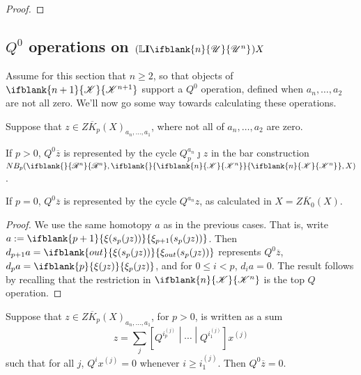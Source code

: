 \documentclass[10pt]{article}
\makeatletter
\newcommand{\PRLie}[1]{\scrR^{#1}}%
\newcommand{\LL}[1]{\ifblank{#1}{\scrK}{\scrK^{#1}}}
\newcommand{\nontop}[1]{\ifblank{#1}{\scrU}{\scrU^{#1}}}
\newcommand{\produces}[3]{{#1}{#3}{#2}}
\newcommand{\Ind}[2][]{\mathbf{I}{#2}_{#1}}%
\newcommand{\Fr}[2][]{\ifblank{#1}{#2}{#2_{#1}}}
\newcommand{\restn}[2][]{\ifblank{#1}{\xi{#2}}{\xi_{#1}{#2}}}%
\newcommand{\derived}{\mathbb{L}}
\renewcommand{\Q}{Q}
\newcommand{\minDimP}{\overline{m}}
\renewcommand{\produces}[3]{
{
\def\labelstyle{\scriptstyle}
\xymatrix@C=2em@1{
{#1}
\ar@{-}[r]|-{{\,#3\,}}
&%
{#2}%
}}}
\makeatother
\begin{document}
\begin{LieLambdaStructureOnKoszul}
\begin{proof}
%
\end{proof}

\subsection{$\Q^0$ operations on $(\derived\Ind{\nontop{n}})X$}
Assume for this section that $n\geq2$, so that objects of $\LL{n+1}$ support a $\Q^0$ operation, defined when $a_n,\ldots,a_2$ are not all zero. We'll now go some way towards calculating these operations.
\begin{lem}
Suppose that $z\in Z\overline{K}_p(X)_{a_n,\ldots,a_1}$, where not all of $a_n,\ldots,a_2$ are zero. 
\begin{itemise}
\setlength{\parindent}{.25in}
\item If $p>0$, $Q^0\overline{z}$ is represented by the cycle $\Q^{a_n}_p\jmath z$ in the bar construction $NB_p(\Fr{\PRLie{n}},\Fr{\LL{n}},X)$.
\item If $p=0$, $Q^0\overline{z}$ is represented by the cycle $\Q^{a_n}z$, as calculated in $X=Z\overline{K}_0(X)$.%
\end{itemise}
\end{lem}
\begin{proof}
We use the same homotopy $a$ as in the previous cases. That is, write
$a:=\restn[p+1]{(s_{p}(\jmath z))}$. Then $d_{p+1}a=\restn[out]{(s_{p}(\jmath z))}$ represents $Q^0\overline{z}$, $d_pa=\restn[p]{(\jmath z)}$, and for $0\leq i<p$, $d_ia=0$. The result follows by recalling that the restriction in $\LL{n}$ is the top $\Q$ operation.
\end{proof}
\begin{lem}
Suppose that $z\in Z\overline{K}_p(X)_{a_n,\ldots,a_1}$, for $p>0$, is written as a sum
\[z=\sum_{j}\left[\Q^{i^{{(j)}}_p}\middle|\cdots \middle|\Q^{i^{{(j)}}_1}\right]x^{(j)}\]
such that for all $j$, 
$\Q^ix^{(j)}=0$ whenever $i\geq i^{{(j)}}_1$. Then $\Q^0\overline{z}=0$.


\end{lem}
\end{LieLambdaStructureOnKoszul}
\end{document}
